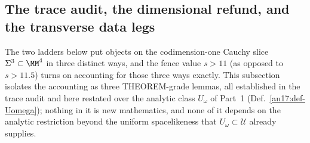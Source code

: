 %

\subsection{The trace audit, the dimensional refund, and the transverse
data legs}\label{an17:sec-traceaudit}\label{sec:an17-fence}%

The two ladders below put objects on the codimension-one Cauchy slice
$\Sigma^3\subset\MM^4$ in three distinct ways, and the fence value $s>11$ (as
opposed to $s>11.5$) turns on accounting for those three ways exactly. This
subsection isolates the accounting as three THEOREM-grade lemmas, all
established in the trace audit and here restated over the analytic class
$U_\omega$ of Part~1 (Def.~\ref{an17:def-Uomega}); nothing in it is new
mathematics, and none of it depends on the analytic restriction beyond the
uniform spacelikeness that $U_\omega\subset\mathcal U$ already supplies.

